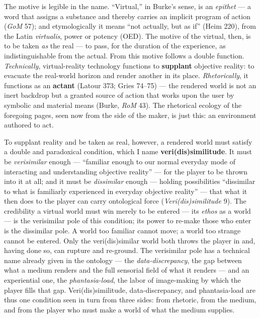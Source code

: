 \documentclass{article}
\begin{document}
The motive is legible in the name. ``Virtual,'' in Burke's sense, is an \textit{epithet} — a word that assigns a substance and thereby carries an implicit program of action (\textit{GoM} 57); and etymologically it means ``not actually, but as if'' (Heim 220), from the Latin \textit{virtualis}, power or potency (OED). The motive of the virtual, then, is to be taken \textit{as} the real — to pass, for the duration of the experience, as indistinguishable from the actual. From this motive follows a double function. \textit{Technically}, virtual-reality technology functions to \textbf{supplant} objective reality: to evacuate the real-world horizon and render another in its place. \textit{Rhetorically}, it functions as an \textbf{actant} (Latour 373; Gries 74–75) — the rendered world is not an inert backdrop but a granted source of action that works upon the user by symbolic and material means (Burke, \textit{RoM} 43). The rhetorical ecology of the foregoing pages, seen now from the side of the maker, is just this: an environment authored to act.

To supplant reality and be taken as real, however, a rendered world must satisfy a double and paradoxical condition, which I name \textbf{veri(dis)similitude}. It must be \textit{verisimilar} enough — ``familiar enough to our normal everyday mode of interacting and understanding objective reality'' — for the player to be thrown into it at all; and it must be \textit{dissimilar} enough — holding possibilities ``dissimilar to what is familiarly experienced in everyday objective reality'' — that what it then does to the player can carry ontological force (\textit{Veri(dis)similitude} 9). The credibility a virtual world must win merely to be entered — its \textit{ethos} as a world — is the verisimilar pole of this condition; its power to re-make those who enter is the dissimilar pole. A world too familiar cannot move; a world too strange cannot be entered. Only the veri(dis)similar world both throws the player in and, having done so, can rupture and re-ground. The verisimilar pole has a technical name already given in the ontology — the \textit{data-discrepancy}, the gap between what a medium renders and the full sensorial field of what it renders — and an experiential one, the \textit{phantasia-load}, the labor of image-making by which the player fills that gap. Veri(dis)similitude, data-discrepancy, and phantasia-load are thus one condition seen in turn from three sides: from rhetoric, from the medium, and from the player who must make a world of what the medium supplies.
\end{document}
